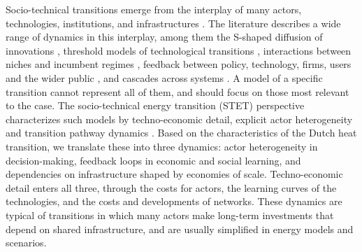 \documentclass[preprint,12pt,authoryear]{elsarticle}
\begin{document}
Socio-technical transitions emerge from the interplay of many actors,
technologies, institutions, and infrastructures
\citep{geelsTechnologicalTransitionsEvolutionary2002,
geelsTechnologicalTransitionsSystem2005}. The literature describes a wide
range of dynamics in this interplay, among them the S-shaped diffusion of
innovations \citep{rogersDiffusionInnovations2003,bassNewProductGrowth1969},
threshold models of technological transitions
\citep{zeppiniThresholdsModelsTechnological2014}, interactions between niches
and incumbent regimes \citep{geelsTypologySociotechnicalTransition2007},
feedback between policy, technology, firms, users and the wider public
\citep{geelsSociotechnicalTransitionPerspective2023}, and cascades across
systems \citep{geelsCrosssystemCascadesDrivers2026}. A model of a specific
transition cannot represent all of them, and should focus on those most
relevant to the case. The socio-technical energy transition (STET)
perspective characterizes such models by techno-economic detail, explicit
actor heterogeneity and transition pathway dynamics
\citep{liReviewSociotechnicalEnergy2015a}. Based on the characteristics of
the Dutch heat transition, we translate these into three dynamics:
actor heterogeneity in decision-making, feedback loops in economic and social
learning, and dependencies on infrastructure shaped by economies of scale.
Techno-economic detail enters all three, through the costs for actors, the
learning curves of the technologies, and the costs and developments of
networks. These dynamics are typical of transitions in which many actors make
long-term investments that depend on shared infrastructure, and are usually
simplified in energy models and scenarios.
\end{document}
